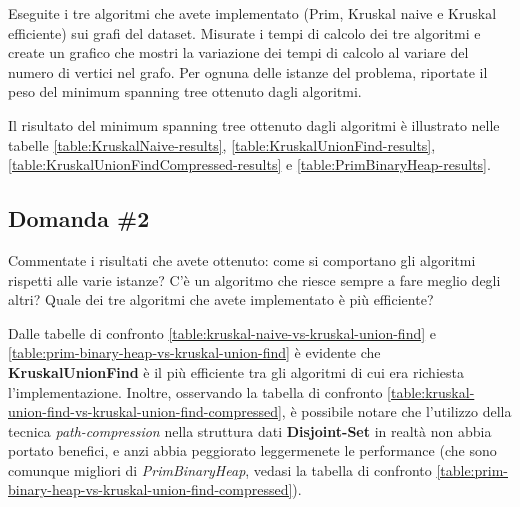 \begin{displayquote}
Eseguite i tre algoritmi che avete implementato (Prim, Kruskal naive e Kruskal efficiente) sui grafi del dataset. Misurate i tempi di calcolo dei tre algoritmi e create un grafico che mostri la variazione dei tempi di calcolo al variare del numero di vertici nel grafo. Per ognuna delle istanze del problema, riportate il peso del minimum spanning tree ottenuto dagli algoritmi. 
\end{displayquote}

\noindent Il risultato del minimum spanning tree ottenuto dagli algoritmi è illustrato nelle tabelle \ref{table:KruskalNaive-results}, \ref{table:KruskalUnionFind-results}, \ref{table:KruskalUnionFindCompressed-results} e \ref{table:PrimBinaryHeap-results}.

\begin{center}
    
\end{center}

\begin{center}
    
\end{center}

\begin{center}
    
\end{center}

\begin{center}
    
\end{center}

\subsection{Domanda \#2}

\begin{displayquote}
Commentate i risultati che avete ottenuto: come si comportano gli algoritmi rispetti alle varie istanze? C'è un algoritmo che riesce sempre a fare meglio degli altri? Quale dei tre algoritmi che avete implementato è più efficiente? 
\end{displayquote}

\noindent Dalle tabelle di confronto \ref{table:kruskal-naive-vs-kruskal-union-find} e \ref{table:prim-binary-heap-vs-kruskal-union-find} è evidente che \textbf{KruskalUnionFind} è il più efficiente tra gli algoritmi di cui era richiesta l'implementazione. Inoltre, osservando la tabella di confronto \ref{table:kruskal-union-find-vs-kruskal-union-find-compressed}, è possibile notare che l'utilizzo della tecnica \textit{path-compression} nella struttura dati \textbf{Disjoint-Set} in realtà non abbia portato benefici, e anzi abbia peggiorato leggermenete le performance (che sono comunque migliori di \textit{PrimBinaryHeap}, vedasi la tabella di confronto \ref{table:prim-binary-heap-vs-kruskal-union-find-compressed}). \\

